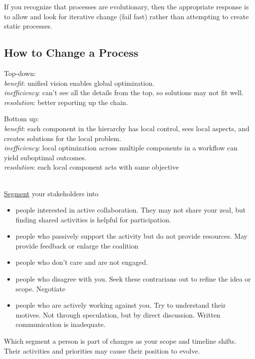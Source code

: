 If you recognize that processes are evolutionary, then the appropriate response is to allow and look for iterative change (fail fast) rather than attempting to create static processes.

\subsection*{How to Change a Process}
Top-down:\\
\textit{benefit}: unified vision enables global optimization.\\
\textit{inefficiency}: can't see all the details from the top, so solutions may not fit well.\\
\textit{resolution}: better reporting up the chain.

Bottom up:\\
\textit{benefit}: each component in the hierarchy has local control, sees local aspects, and creates solutions for the local problem.\\
\textit{inefficiency}: local optimization across multiple components in a workflow can yield suboptimal outcomes.\\
\textit{resolution}: each local component acts with same objective

\ \\

\href{https://en.wikipedia.org/wiki/Market_segmentation}{Segment} your stakeholders into 

\begin{itemize}
 \item people interested in active collaboration. They may not share your zeal, but finding shared activities is helpful for participation.
    \item people who passively support the activity but do not provide resources. May provide feedback or enlarge the coalition
    \item people who don't care and are not engaged.
    \item people who disagree with you. Seek these contrarians out to refine the idea or scope. Negotiate
    \item people who are actively working against you. Try to understand their motives. Not through speculation, but by direct discussion. Written communication is inadequate. 
\end{itemize}

Which segment a person is part of changes as your scope and timeline shifts. Their activities and priorities may cause their position to evolve. 

